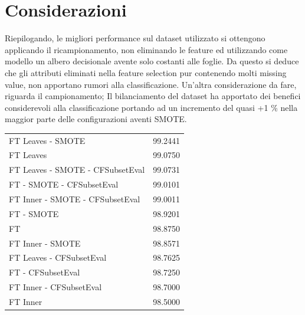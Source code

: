\section{Considerazioni}
Riepilogando, le migliori performance sul dataset utilizzato si ottengono applicando il ricampionamento, non eliminando le feature ed utilizzando come modello un albero decisionale avente solo costanti alle foglie.
Da questo si deduce che gli attributi eliminati nella feature selection pur contenendo molti missing value, non apportano rumori alla classificazione.
Un'altra considerazione da fare, riguarda il campionamento; Il bilanciamento del dataset ha apportato dei benefici considerevoli alla classificazione portando ad un incremento del quasi +1 \% nella maggior parte delle configurazioni aventi SMOTE.

\begin{table}[htbp]
	\begin{tabular}{l r}
		FT Leaves - SMOTE & 99.2441 \\
		FT Leaves & 99.0750 \\
		FT Leaves - SMOTE - CFSubsetEval & 99.0731 \\
		FT - SMOTE - CFSubsetEval & 99.0101 \\
		FT Inner - SMOTE - CFSubsetEval & 99.0011 \\		
		FT - SMOTE & 98.9201 \\
		FT & 98.8750 \\
		FT Inner - SMOTE & 98.8571 \\
		FT Leaves - CFSubsetEval & 98.7625 \\ 
		FT - CFSubsetEval & 98.7250 \\
		FT Inner - CFSubsetEval & 98.7000 \\
		FT Inner & 98.5000 \\
	\end{tabular}
\end{table}













